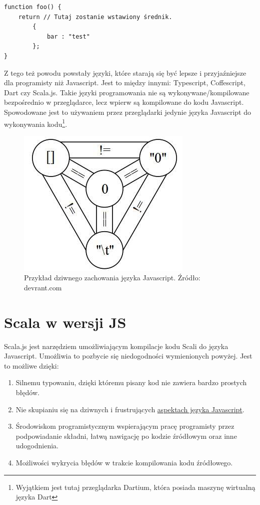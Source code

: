 \begin{lstlisting}[label={lst:javascriptSUCKS},
frame=single, numbers=none,captionpos=b, 
caption={Przykład niepoprawnego kodu Javascript wynikłego z automatycznego wstawienia średnika}]
function foo() {
    return // Tutaj zostanie wstawiony średnik.
        {
            bar : "test"
        };
}
\end{lstlisting}


Z tego też powodu powstały języki, które starają się być lepsze i przyjaźniejsze dla programisty niż Javascript. Jest to między innymi: Typescript, Coffescript, Dart czy Scala.js. Takie języki programowania nie są wykonywane/kompilowane bezpośrednio w przeglądarce, lecz wpierw są kompilowane do kodu Javascript. Spowodowane jest to używaniem przez przeglądarki jedynie języka Javascript do wykonywania kodu\footnote{Wyjątkiem jest tutaj przeglądarka Dartium, która posiada maszynę wirtualną języka Dart\cite{Dartium}}. 

\begin{figure}[h]
	\centering
	\includegraphics{images/javagod.png}
	 \caption{Przykład dziwnego zachowania języka Javascript. Źródło: devrant.com}
\end{figure}

\section{Scala w wersji JS}

Scala.js jest narzędziem umożliwiającym kompilacje kodu Scali do języka Javascript. Umożliwia to pozbycie się niedogodności wymienionych powyżej. Jest to możliwe dzięki:



\begin{enumerate}
	\item Silnemu typowaniu, dzięki któremu pisany kod nie zawiera bardzo prostych błędów.
	\item Nie skupianiu się na dziwnych i frustrujących \hyperref[lst:javascriptSUCKS]{aspektach języka Javascript}.
	\item Środowiskom programistycznym wspierającym pracę programisty przez podpowiadanie składni, łatwą nawigację po kodzie źródłowym oraz inne udogodnienia.
	\item Możliwości wykrycia błędów w trakcie kompilowania kodu źródłowego.
\end{enumerate}


